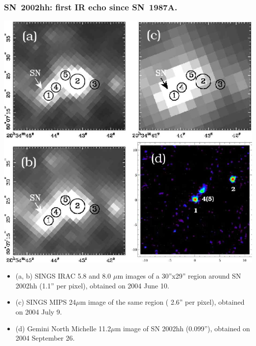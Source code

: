 \begin{frame}\frametitle{SN~2002hh: first IR echo since SN~1987A.}





\begin{minipage}[t]{0.5\textwidth}
\vspace{0.5cm}
\begin{center}
\includegraphics[width=\textwidth,height=!]{./D/barlow_sn2002hh_fig1.jpg}
\end{center}
\end{minipage}
\begin{minipage}[t]{0.48\textwidth}
\vspace{-0.5cm}
\begin{itemize}
\item (a, b) SINGS IRAC 5.8 and 8.0 $\mu$m images of a 30''x29'' region
   around SN 2002hh (1.1'' per pixel), obtained on 2004 June 10.

\item (c) SINGS MIPS 24$\mu$m image of the same region ( 2.6'' per
   pixel), obtained on 2004 July 9.

\item (d) Gemini North Michelle 11.2$\mu$m image of SN 2002hh (0.099''),
   obtained on 2004 September 26.
\end{itemize}
\end{minipage}


\end{frame}
